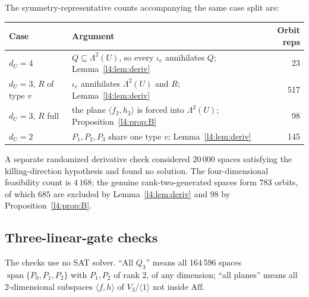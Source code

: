 \documentclass[11pt,a4paper]{article}
\theoremstyle{plain}
\theoremstyle{remark}
\newcommand{\Aff}{\mathrm{Aff}}
\newcommand{\Span}{\operatorname{span}}
\newcommand{\Lam}{\Lambda^2}
\newcommand{\dU}{d_U}
\begin{document}
The symmetry-representative counts accompanying the same case split are:
\begin{center}
\begin{tabularx}{0.92\textwidth}{@{}l X r@{}}
\toprule
Case & Argument & Orbit reps \\
\midrule
$\dU=4$ & $Q\subseteq\Lam(U)$, so every $\iota_e$ annihilates $Q$; Lemma~\ref{l4:lem:deriv} & 23\\
$\dU=3$, $R$ of type $v$ & $\iota_e$ annihilates $\Lam(U)$ and $R$; Lemma~\ref{l4:lem:deriv} & 517\\
$\dU=3$, $R$ full & the plane $\langle f_2,h_2\rangle$ is forced into $\Lam(U)$; Proposition~\ref{l4:prop:B} & 98\\
$\dU=2$ & $P_1,P_2,P_3$ share one type $v$; Lemma~\ref{l4:lem:deriv} & 145\\
\bottomrule
\end{tabularx}
\end{center}
A separate randomized derivative check considered $20\,000$ spaces satisfying the killing-direction hypothesis and found no solution. The four-dimensional feasibility count is $4\,168$; the genuine rank-two-generated spaces form $783$ orbits, of which $685$ are excluded by Lemma~\ref{l4:lem:deriv} and $98$ by Proposition~\ref{l4:prop:B}.
\subsection{Three-linear-gate checks}
The checks use no SAT solver. ``All $Q_3$'' means all 164\,596 spaces $\Span\{P_0,P_1,P_2\}$ with $P_1,P_2$ of rank 2, of any dimension; ``all planes'' means all 2-dimensional subspaces $\langle f,h\rangle$ of $V_3/\langle1\rangle$ not inside $\Aff$.
\end{document}
